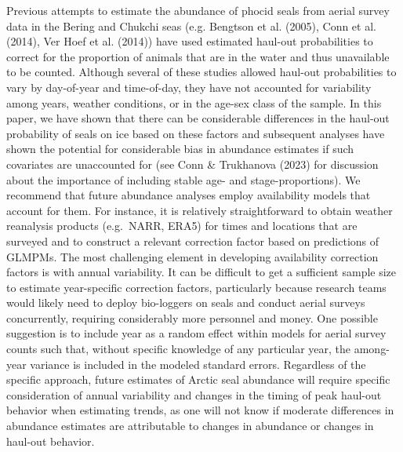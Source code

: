\documentclass[fleqn,10pt,lineno]{wlpeerj} %
\begin{document}
Previous attempts to estimate the abundance of phocid seals from aerial survey
data in the Bering and Chukchi seas (e.g. Bengtson et al. (2005), Conn et al. (2014),
Ver Hoef et al. (2014)) have used estimated haul-out probabilities to correct for the
proportion of animals that are in the water and thus unavailable to be counted.
Although several of these studies allowed haul-out probabilities to vary by
day-of-year and time-of-day, they have not accounted for variability among
years, weather conditions, or in the age-sex class of the sample. In this paper,
we have shown that there can be considerable differences in the haul-out
probability of seals on ice based on these factors and subsequent analyses have
shown the potential for considerable bias in abundance estimates if such
covariates are unaccounted for (see Conn \& Trukhanova (2023) for discussion about the
importance of including stable age- and stage-proportions). We recommend that
future abundance analyses employ availability models that account for them. For
instance, it is relatively straightforward to obtain weather reanalysis products
(e.g.~NARR, ERA5) for times and locations that are surveyed and to construct a
relevant correction factor based on predictions of GLMPMs. The most challenging
element in developing availability correction factors is with annual
variability. It can be difficult to get a sufficient sample size to estimate
year-specific correction factors, particularly because research teams would
likely need to deploy bio-loggers on seals and conduct aerial surveys
concurrently, requiring considerably more personnel and money. One possible
suggestion is to include year as a random effect within models for aerial survey
counts such that, without specific knowledge of any particular year, the
among-year variance is included in the modeled standard errors. Regardless of
the specific approach, future estimates of Arctic seal abundance will require
specific consideration of annual variability and changes in the timing of peak
haul-out behavior when estimating trends, as one will not know if moderate
differences in abundance estimates are attributable to changes in abundance or
changes in haul-out behavior.
\end{document}
